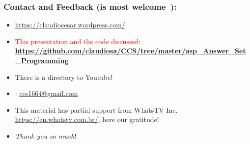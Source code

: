 \documentclass{beamer}
\begin{document}
\begin{frame}
\frametitle{Contact and Feedback (is most welcome\ \Smiley):}
  
\begin{block}{}
  \begin{itemize}
  \item \url{https://claudiocesar.wordpress.com/}
   \item \textcolor{red}{This presentation and the code discussed}:\\
   \textbf{\textcolor{blue}{\url{https://github.com/claudiosa/CCS/tree/master/asp_Answer_Set_Programming}}}
   \item There is a directory to Youtube!
    
  \item \Letter: \url{ccs1664@gmail.com}
  \item This material has partial support from WhatsTV Inc. \url{https://en.whatstv.com.br/}, here our gratitude!
  \item \textit{Thank you so much}!

  \end{itemize}
  \end{block}

\end{frame}


\end{document}
